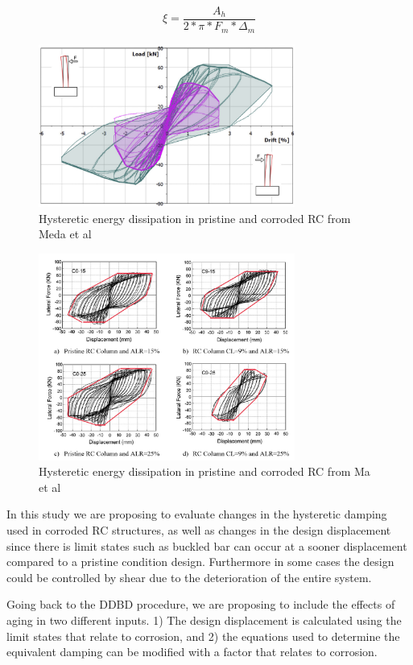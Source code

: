 \begin{equation}
    \xi=\frac{A_h}{2*\pi*F_m*\Delta_m}
    \label{eq:JacobsenEquation}
\end{equation}

\begin{figure}[htbp]
	\centering
    \includegraphics[width=0.75\textwidth]{VAC Prelim 2.0/Chapter-5/figs/Meda_HystereticArea_01.png}
	\caption{Hysteretic energy dissipation in pristine and corroded RC from Meda et al \cite{Meda2014}}
	\label{fig:DDBD_sum}
\end{figure}

\begin{figure}[htbp]
	\centering
    \includegraphics[width=0.75\textwidth]{VAC Prelim 2.0/Chapter-5/figs/Ma_HystereticArea_01.png}
	\caption{Hysteretic energy dissipation in pristine and corroded RC from Ma et al \cite{Meda2014}}
	\label{fig:DDBD_sum}
\end{figure}

In this study we are proposing to evaluate changes in the hysteretic damping used in corroded RC structures, as well as changes in the design displacement since there is limit states such as buckled bar can occur at a sooner displacement compared to a pristine condition design. Furthermore in some cases the design could be controlled by shear due to the deterioration of the entire system.

Going back to the DDBD procedure, we are proposing to include the effects of aging in two different inputs. 1) The design displacement is calculated using the limit states that relate to corrosion, and 2) the equations used to determine the equivalent damping can be modified with a factor that relates to corrosion.
